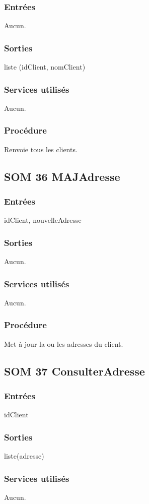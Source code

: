 \subsubsection{Entrées}
Aucun.
\subsubsection{Sorties}
liste (idClient, nomClient)
\subsubsection{Services utilisés}
Aucun.
\subsubsection{Procédure}
Renvoie tous les clients.

\subsection{SOM 36 MAJAdresse}
\subsubsection{Entrées}
idClient, nouvelleAdresse
\subsubsection{Sorties}
Aucun.
\subsubsection{Services utilisés}
Aucun.
\subsubsection{Procédure}
Met à jour la ou les adresses du client.

\subsection{SOM 37 ConsulterAdresse}
\subsubsection{Entrées}
idClient
\subsubsection{Sorties}
liste(adresse)
\subsubsection{Services utilisés}
Aucun.

